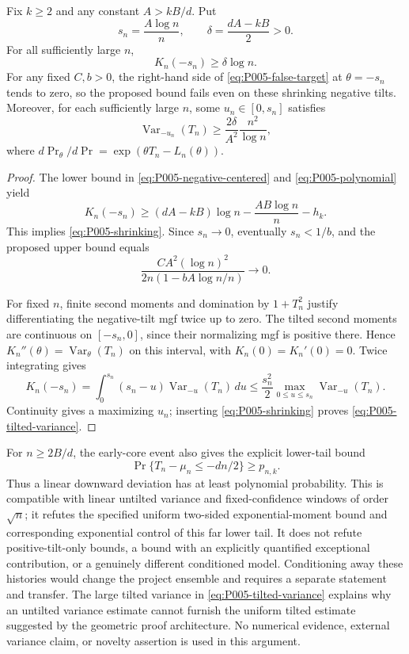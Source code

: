 \begin{corollary}
\label{cor:P005-shrinking-tilt}
Fix $k\ge2$ and any constant $A>kB/d$. Put
\[
 s_n=\frac{A\log n}{n},\qquad
 \delta=\frac{dA-kB}{2}>0.
\]
For all sufficiently large $n$,
\begin{equation}
 K_n(-s_n)\ge\delta\log n.
 \label{eq:P005-shrinking}
\end{equation}
For any fixed $C,b>0$, the right-hand side of
\eqref{eq:P005-false-target} at $\theta=-s_n$ tends to zero, so
the proposed bound fails even on these shrinking negative tilts.
Moreover, for each sufficiently large $n$, some $u_n\in[0,s_n]$
satisfies
\begin{equation}
 \operatorname{Var}_{-u_n}(T_n)
 \ge\frac{2\delta}{A^2}\frac{n^2}{\log n},
 \label{eq:P005-tilted-variance}
\end{equation}
where $d\Pr_\theta/d\Pr=\exp(\theta T_n-L_n(\theta))$.
\end{corollary}
\begin{proof}
The lower bound in \eqref{eq:P005-negative-centered} and
\eqref{eq:P005-polynomial} yield
\[
 K_n(-s_n)\ge(dA-kB)\log n
                -\frac{AB\log n}{n}-h_k.
\]
This implies \eqref{eq:P005-shrinking}. Since $s_n\to0$, eventually
$s_n<1/b$, and the proposed upper bound equals
\[
 \frac{CA^2(\log n)^2}{2n(1-bA\log n/n)}\longrightarrow0.
\]

For fixed $n$, finite second moments and domination by $1+T_n^2$
justify differentiating the negative-tilt mgf twice up to zero.
The tilted second moments are continuous on $[-s_n,0]$, since their
normalizing mgf is positive there. Hence
$K_n''(\theta)=\operatorname{Var}_\theta(T_n)$ on this interval,
with $K_n(0)=K_n'(0)=0$. Twice integrating gives
\[
 K_n(-s_n)=\int_0^{s_n}(s_n-u)
                         \operatorname{Var}_{-u}(T_n)\,du
 \le\frac{s_n^2}{2}
              \max_{0\le u\le s_n}\operatorname{Var}_{-u}(T_n).
\]
Continuity gives a maximizing $u_n$; inserting
\eqref{eq:P005-shrinking} proves \eqref{eq:P005-tilted-variance}.
\end{proof}

\begin{remark}
For $n\ge2B/d$, the early-core event also gives the explicit lower-tail
bound
\[
 \Pr\{T_n-\mu_n\le-dn/2\}\ge p_{n,k}.
\]
Thus a linear downward deviation has at least polynomial probability.
This is compatible with linear untilted variance and fixed-confidence
windows of order $\sqrt n$; it refutes the specified uniform two-sided
exponential-moment bound and corresponding exponential control of this
far lower tail. It does not refute positive-tilt-only bounds, a bound
with an explicitly quantified exceptional contribution, or a genuinely
different conditioned model. Conditioning away these histories would
change the project ensemble and requires a separate statement and transfer.
The large tilted variance in \eqref{eq:P005-tilted-variance} explains why
an untilted variance estimate cannot furnish the uniform tilted estimate
suggested by the geometric proof architecture. No numerical evidence,
external variance claim, or novelty assertion is used in this argument.
\end{remark}
